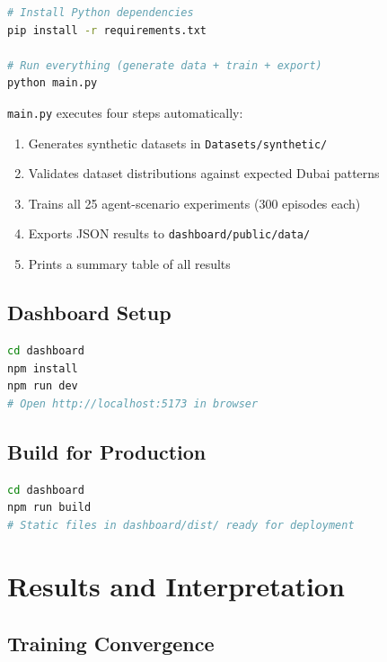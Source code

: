 \documentclass[12pt, a4paper]{article}
\begin{document}
\begin{lstlisting}[language=bash, numbers=none]
# Install Python dependencies
pip install -r requirements.txt

# Run everything (generate data + train + export)
python main.py
\end{lstlisting}

\texttt{main.py} executes four steps automatically:
\begin{enumerate}[nosep]
    \item Generates synthetic datasets in \texttt{Datasets/synthetic/}
    \item Validates dataset distributions against expected Dubai patterns
    \item Trains all 25 agent-scenario experiments (300 episodes each)
    \item Exports JSON results to \texttt{dashboard/public/data/}
    \item Prints a summary table of all results
\end{enumerate}

\subsection{Dashboard Setup}

\begin{lstlisting}[language=bash, numbers=none]
cd dashboard
npm install
npm run dev
# Open http://localhost:5173 in browser
\end{lstlisting}

\subsection{Build for Production}

\begin{lstlisting}[language=bash, numbers=none]
cd dashboard
npm run build
# Static files in dashboard/dist/ ready for deployment
\end{lstlisting}

\section{Results and Interpretation}

\subsection{Training Convergence}
\end{document}
